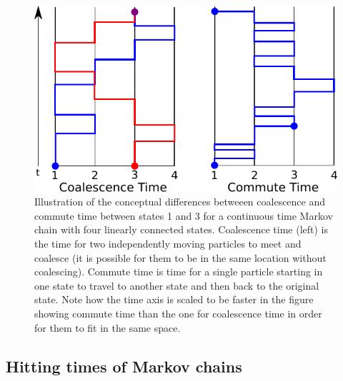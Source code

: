 \documentclass{article}
\begin{document}
\begin{figure}
\centering
     \includegraphics[scale=.5]{figs/conceptn}
    \caption{
    Illustration of the conceptual differences
    betweeen coalescence and commute time between states 1 and 3 
    for a continuous time Markov chain with four linearly connected states. 
    Coalescence time (left) is the time for two independently moving particles to meet and coalesce 
    (it is possible for them to be in the same location without coalescing).
    Commute time is time for a single particle starting in one state to travel to another state 
    and then back to the original state.
    Note how the time axis is scaled to be faster in the figure showing commute time
    than the one for coalescence time in order for them to fit in the same space.
    } \label{fig:concept_coalcom}
\end{figure}


\subsection*{Hitting times of Markov chains}
\end{document}
